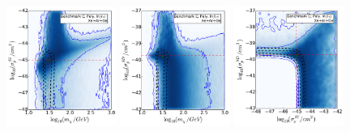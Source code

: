 \begin{figure}[!ht]
  \includegraphics[width=0.32\textwidth]{NT/BenchmarkC_poly_noIC-mx_sigsi.pdf}
  \includegraphics[width=0.32\textwidth]{NT/BenchmarkC_poly_noIC-mx_sigsd.pdf}
  \includegraphics[width=0.32\textwidth]{NT/BenchmarkC_poly_noIC-sigsi_sigsd.pdf}


\end{figure}
